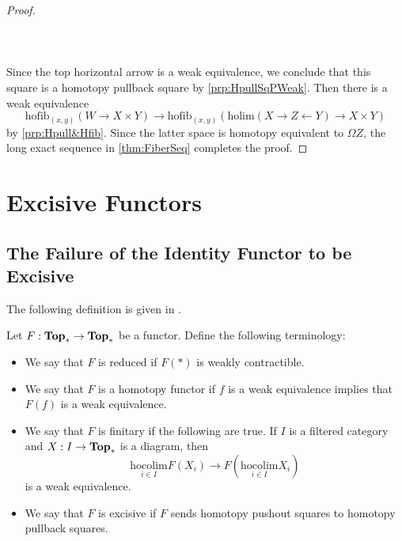 \begin{prp}
\begin{proof}
\\~\\  \\~\\
Since the top horizontal arrow is a weak equivalence, we conclude that this square is a homotopy pullback square by \ref{prp:HpullSqPWeak}. Then there is a weak equivalence $$\text{hofib}_{(x,y)}(W\to X\times Y)\to\text{hofib}_{(x,y)}(\text{holim}(X\rightarrow Z\leftarrow Y)\to X\times Y)$$ by \ref{prp:Hpull&Hfib}. Since the latter space is homotopy equivalent to $\Omega Z$, the long exact sequence in \ref{thm:FiberSeq} completes the proof. 
\end{proof}
\end{prp}

\section{Excisive Functors}
\subsection{The Failure of the Identity Functor to be Excisive}
The following definition is given in \cite{CHT}. 

\begin{defn}\label{defn:Excisive} Let $F:\bold{Top}_\ast\to\bold{Top}_\ast$ be a functor. Define the following terminology: 
\begin{itemize}
\item We say that $F$ is reduced if $F(\ast)$ is weakly contractible. 
\item We say that $F$ is a homotopy functor if $f$ is a weak equivalence implies that $F(f)$ is a weak equivalence. 
\item We say that $F$ is finitary if the following are true. If $I$ is a filtered category and $X:I\to\bold{Top}_\ast$ is a diagram, then $$\underset{i\in I}{\text{hocolim}}F(X_i)\to F\left(\underset{i\in I}{\text{hocolim}}X_i\right)$$ is a weak equivalence. 
\item We say that $F$ is excisive if $F$ sends homotopy pushout squares to homotopy pullback squares. 
\end{itemize}
\end{defn}

